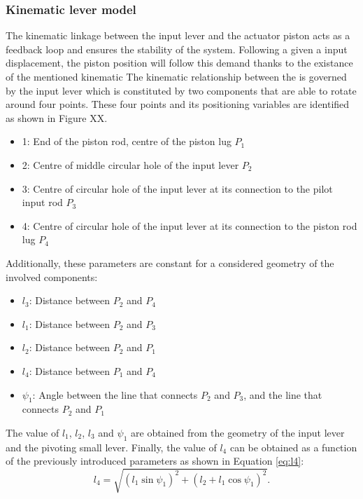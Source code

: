   \clearpage
  \subsubsection{Kinematic lever model}

    The kinematic linkage between the input lever and the actuator piston acts as a feedback loop and ensures the stability of the system. Following a given a input displacement, the piston position will follow this demand thanks to the existance of the mentioned kinematic 
    The kinematic relationship between the is governed by the input lever which is constituted by two components that are able to rotate around four points. These four points and its positioning variables are identified as shown in Figure XX.
    \begin{itemize}
      \item 1: End of the piston rod, centre of the piston lug $P_1$
      \item 2: Centre of middle circular hole of the input lever $P_2$
      \item 3: Centre of circular hole of the input lever at its connection to the pilot input rod $P_3$
      \item 4: Centre of circular hole of the input lever at its connection to the piston rod lug $P_4$
    \end{itemize}
    Additionally, these parameters are constant for a considered geometry of the involved components:
    \begin{itemize}
      \item $l_3$: Distance between $P_2$ and $P_4$
      \item $l_1$: Distance between $P_2$ and $P_3$
      \item $l_2$: Distance between $P_2$ and $P_1$
      \item $l_4$: Distance between $P_1$ and $P_4$
      \item $\psi_1$: Angle between the line that connects $P_2$ and $P_3$, and the line that connects $P_2$ and $P_1$
    \end{itemize}

    The value of $l_1$, $l_2$, $l_3$ and $\psi_1$ are obtained from the geometry of the input lever and the pivoting small lever. Finally, the value of $l_4$ can be obtained as a function of the previously introduced parameters as shown in Equation \ref{eq:l4}:
    \begin{equation}\label{eq:l4}
      l_4 = \sqrt{ (l_1 \sin\psi_1)^2 + (l_2 + l_1 \cos\psi_1)^2 }.
    \end{equation}

